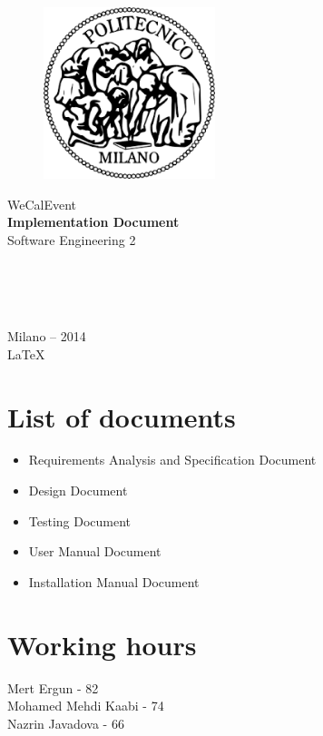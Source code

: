 \documentclass[12pt,openany]{book}
\renewcommand{\thesection}{\arabic{section}}
\begin{document}
\begin{titlepage} %
\begin{figure}[tbh]
  \begin{center}
    \includegraphics[width=50mm]{logo}
  \end{center}
\end{figure}
\begin{center} %
\Huge WeCalEvent \\


\Huge\textbf { Implementation Document\\[0.5cm]
}
\Large Software Engineering 2
\begin{flushleft}\large
{}\\
\\
\\

\end{flushleft}
\vfill %

\large Milano -- 2014 \\ %
{\large \LaTeX}
\end{center} %

\thispagestyle{empty} %
\end{titlepage} %
\setcounter{section}{0}
\renewcommand{\thesection}{\arabic{section}}
\setcounter{secnumdepth}{3}\setcounter{tocdepth}{3}
%
\pagestyle{plain}
	
\newpage

\section{List of documents}
\begin{itemize}
  \item Requirements Analysis and Specification Document
  \item Design Document
  \item Testing Document
  \item User Manual Document
  \item Installation Manual Document
\end{itemize}


\section{Working hours}
\qquad Mert Ergun - 82\\
\qquad Mohamed Mehdi Kaabi - 74\\
\qquad Nazrin Javadova - 66\\
\end{document}
